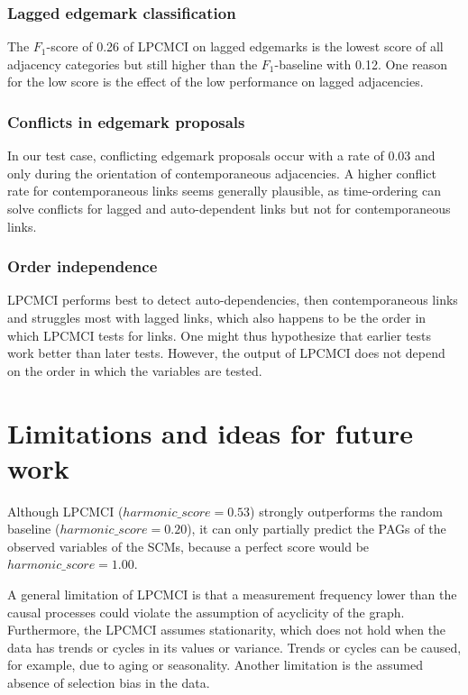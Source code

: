 \documentclass[conference]{IEEEtran}
\begin{document}
\subsubsection{Lagged edgemark classification}
The $F_1$-score of 0.26 of LPCMCI on lagged edgemarks is the lowest score of all adjacency categories but still higher than the $F_1$-baseline with 0.12.
One reason for the low score is the effect of the low performance on lagged adjacencies.

\subsubsection{Conflicts in edgemark proposals}
In our test case, conflicting edgemark proposals occur with a rate of 0.03 and only during the orientation of contemporaneous adjacencies. A higher conflict rate for contemporaneous links seems generally plausible, as time-ordering can solve conflicts for lagged and auto-dependent links but not for contemporaneous links.

\subsubsection{Order independence}
LPCMCI performs best to detect auto-dependencies, then contemporaneous links and struggles most with lagged links, which also happens to be the order in which LPCMCI tests for links. One might thus hypothesize that earlier tests work better than later tests. However, the output of LPCMCI does not depend on the order in which the variables are tested\cite{gerhardus_high-recall_2021}.


\section{Limitations and ideas for future work}
Although LPCMCI ($harmonic\_score=0.53$) strongly outperforms the random baseline ($harmonic\_score=0.20$), it can only partially predict the PAGs of the observed variables of the SCMs, because a perfect score would be $harmonic\_score=1.00$.

A general limitation of LPCMCI is that a measurement frequency lower than the causal processes could violate the assumption of acyclicity of the graph. 
Furthermore, the LPCMCI assumes stationarity, which does not hold when the data has trends or cycles in its values or variance. Trends or cycles can be caused, for example, due to aging or seasonality. 
Another limitation is the assumed absence of selection bias in the data.
\end{document}
